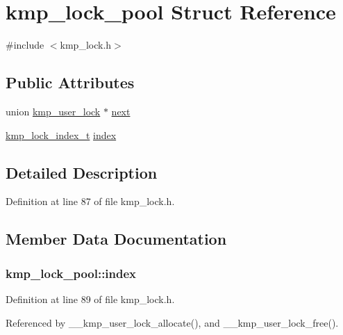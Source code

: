 \hypertarget{structkmp__lock__pool}{\section{kmp\-\_\-lock\-\_\-pool Struct Reference}
\label{structkmp__lock__pool}
}


{\ttfamily \#include $<$kmp\-\_\-lock.\-h$>$}

\subsection*{Public Attributes}
\begin{DoxyCompactItemize}
\item 
union \hyperlink{unionkmp__user__lock}{kmp\-\_\-user\-\_\-lock} $\ast$ \hyperlink{structkmp__lock__pool_af643d9132f2383574cec0a390a215014}{next}
\item 
\hyperlink{kmp__lock_8h_ab39663a4351cc2f0ef04180107a5db84}{kmp\-\_\-lock\-\_\-index\-\_\-t} \hyperlink{structkmp__lock__pool_a2a8f902fec6d5df831656b286838fb24}{index}
\end{DoxyCompactItemize}


\subsection{Detailed Description}


Definition at line 87 of file kmp\-\_\-lock.\-h.



\subsection{Member Data Documentation}
\hypertarget{structkmp__lock__pool_a2a8f902fec6d5df831656b286838fb24}{
\subsubsection[{index}]{ kmp\-\_\-lock\-\_\-pool\-::index}}\label{structkmp__lock__pool_a2a8f902fec6d5df831656b286838fb24}


Definition at line 89 of file kmp\-\_\-lock.\-h.



Referenced by \-\_\-\-\_\-kmp\-\_\-user\-\_\-lock\-\_\-allocate(), and \-\_\-\-\_\-kmp\-\_\-user\-\_\-lock\-\_\-free().

